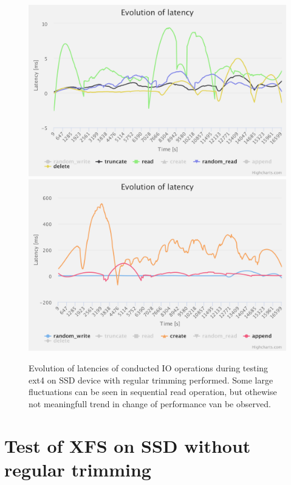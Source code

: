 \documentclass[
  color, %
  table, %
  lof,   %
  lot,   %
]{fithesis3}
\begin{document}
\begin{figure}[!htb]
    \centering
   \begin{minipage}{\textwidth}
        \centering
        \includegraphics[width=\textwidth]{../charts/SSD_ext4_trim/1}
        \includegraphics[width=\textwidth]{../charts/SSD_ext4_trim/2}
                \caption[Evolution of latencies of ext4 during testing on SSD with regular trimming]{Evolution of latencies of conducted IO operations during testing ext4 on SSD device with regular trimming performed. Some large fluctuations can be seen in sequential read operation, but othewise not meaningfull trend in change of performance van be observed.}
\label{fig:lats_ext4_ssd}
    \end{minipage}
\end{figure}

\clearpage


\section{Test of XFS on SSD without regular trimming}
\end{document}
